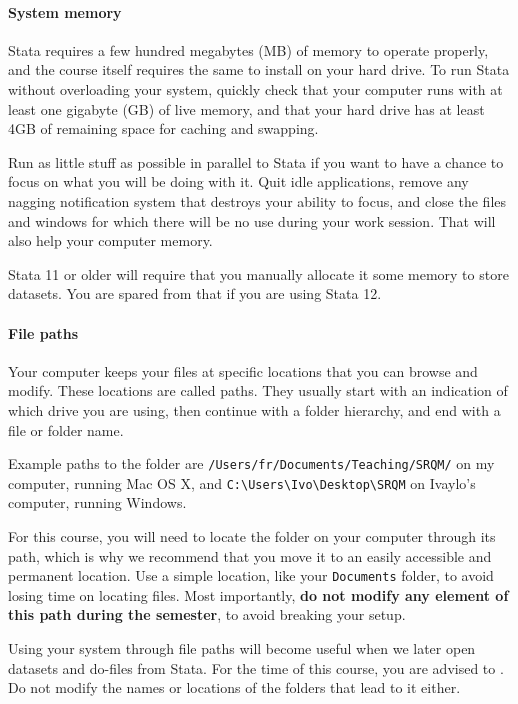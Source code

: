 \paragraph{System memory}%
%
Stata requires a few hundred megabytes (MB) of memory to operate properly, and the course itself requires the same to install on your hard drive. To run Stata without overloading your system, quickly check that your computer runs with at least one gigabyte (GB) of live memory, and that your hard drive has at least 4GB of remaining space for caching and swapping.

Run as little stuff as possible in parallel to Stata if you want to have a chance to focus on what you will be doing with it. Quit idle applications, remove any nagging notification system that destroys your ability to focus, and close the files and windows for which there will be no use during your work session. That will also help your computer memory.

Stata 11 or older will require that you manually allocate it some memory to store datasets. You are spared from that if you are using Stata 12. %


\paragraph{File paths}%
%
Your computer keeps your files at specific locations that you can browse and modify. These locations are called paths. They usually start with an indication of which drive you are using, then continue with a folder hierarchy, and end with a file or folder name. 

Example paths to the \SRQM folder are \texttt{/Users/fr/Documents/Teaching/SRQM/} on my computer, running Mac OS X, and \texttt{C:\textbackslash{}Users\textbackslash{}Ivo\textbackslash{}Desktop\textbackslash{}SRQM} on Ivaylo's computer, running Windows.

For this course, you will need to locate the \SRQM folder on your computer through its path, which is why we recommend that you move it to an easily accessible and permanent location. Use a simple location, like your \texttt{Documents} folder, to avoid losing time on locating files. Most importantly, \textbf{do not modify any element of this path during the semester}, to avoid breaking your setup.

Using your system through file paths will become useful when we later open datasets and do-files from Stata. For the time of this course, you are advised to . Do not modify the names or locations of the folders that lead to it either.


